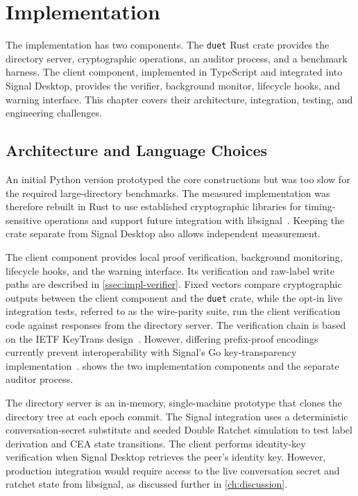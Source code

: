 \chapter{Implementation}\label{ch:impl}

The implementation has two components. The \texttt{duet} Rust crate provides the directory server,
cryptographic operations, an auditor process, and a benchmark harness. The client component,
implemented in TypeScript and integrated into Signal Desktop,
provides the verifier, background monitor, lifecycle hooks, and warning interface. This chapter
covers their architecture, integration, testing, and engineering challenges.

\section{Architecture and Language Choices}\label{sec:impl-strategy}

An initial Python version prototyped the core constructions
but was too slow for the required large-directory benchmarks. The measured implementation was
therefore rebuilt in Rust to use established cryptographic libraries for timing-sensitive operations
and support future integration with libsignal~\cite{libsignal}. Keeping the crate separate from
Signal Desktop also allows independent measurement.

The client component provides local proof verification, background monitoring, lifecycle hooks, and
the warning interface. Its verification and raw-label write paths are described in
\cref{ssec:impl-verifier}. Fixed vectors compare cryptographic outputs between the client component
and the \texttt{duet} crate, while the opt-in live integration tests, referred to as the wire-parity
suite, run the client verification code against responses from the directory server. The
verification chain is based on the IETF KeyTrans design~\cite{ietf-keytrans-protocol}. However,
differing prefix-proof encodings currently prevent interoperability with Signal's Go
key-transparency implementation~\cite{signal-kt-server}.  shows the two
implementation components and the separate auditor process.

The directory server is an in-memory, single-machine prototype that clones the directory tree at
each epoch commit. The Signal integration uses a deterministic conversation-secret substitute and
seeded Double Ratchet simulation to test label derivation and CEA state transitions. The client
performs identity-key verification when Signal Desktop retrieves the peer's identity key. However,
production integration would require access to the live conversation secret and ratchet state from
libsignal, as discussed further in \cref{ch:discussion}.

